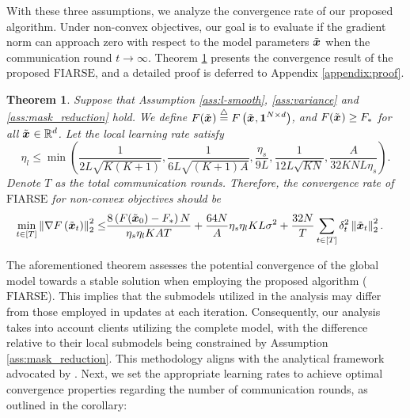 \documentclass{article}
\renewcommand{\cite}{\citep}
\theoremstyle{plain}
\newtheorem{theorem}{Theorem}[section]
\theoremstyle{definition}
\theoremstyle{remark}
\newcommand{\algo}{\ensuremath{\text{FIARSE}}\xspace}
\newcommand{\defeq}{\overset{\triangle}{=}}
\newcommand{\bracket}[1]{\left(#1\right)}
\newcommand{\norm}[1]{\left\|#1\right\|_2^2}
\begin{document}
With these three assumptions, we analyze the convergence rate of our proposed algorithm. Under non-convex objectives, our goal is to evaluate if the gradient norm can approach zero with respect to the model parameters $\x{}$ when the communication round $t \rightarrow \infty$. Theorem \ref{theo:algo} presents the convergence result of the proposed \algo, and a detailed proof is deferred to Appendix \ref{appendix:proof}. 

\begin{theorem} \label{theo:algo}
Suppose that Assumption \ref{ass:l-smooth}, \ref{ass:variance} and \ref{ass:mask_reduction} hold. We define $F(\x{}) \defeq F\bracket{\x{}, \boldsymbol{1}^{N \times d}}$, and $F(\x{}) \geq F_*$ for all $\x{} \in \mathbb{R}^d$. Let the local learning rate satisfy 
\begin{equation*}
\eta_l \leq \min \bracket{\frac{1}{2L\sqrt{K(K+1)}}, \frac{1}{6L\sqrt{(K+1) A}}, \frac{\eta_s}{9L}, \frac{1}{12 L \sqrt{KN}}, \frac{A}{32KNL \eta_s}}. 
\end{equation*}
Denote $T$ as the total communication rounds. Therefore, the convergence rate of \algo for non-convex objectives should be 
\begin{align} \label{eq:theorem_main}
    \min_{t \in [T]} \norm{\nabla F\bracket{\x{t}}} \leq & \frac{8  \bracket{F(\x{0}) - F_*} N}{\eta_s \eta_l K A T} + \frac{64 N}{A} \eta_s \eta_l K L \sigma^2 + \frac{32N}{T} \sum_{t \in [T]} \delta_t^2 \norm{\x{t}}. 
\end{align}
\end{theorem}

The aforementioned theorem assesses the potential convergence of the global model towards a stable solution when employing the proposed algorithm (\algo). This implies that the submodels utilized in the analysis may differ from those employed in updates at each iteration. Consequently, our analysis takes into account clients utilizing the complete model, with the difference relative to their local submodels being constrained by Assumption \ref{ass:mask_reduction}. This methodology aligns with the analytical framework advocated by \cite{zhou2023every}. Next, we set the appropriate learning rates to achieve optimal convergence properties regarding the number of communication rounds, as outlined in the corollary:
\end{document}
